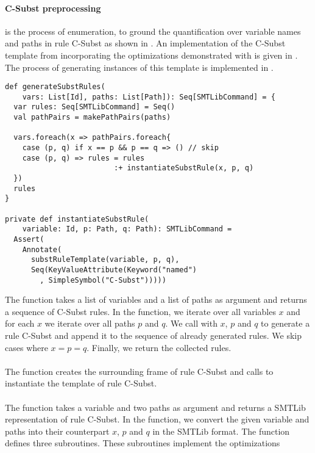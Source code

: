 \paragraph{C-Subst preprocessing} is the process of enumeration,
to ground the quantification over variable names and paths
in rule C-Subst as shown in .
An implementation of the C-Subst template from 
incorporating the optimizations demonstrated with 
is given in .
The process of generating instances of this template
is implemented in .
%
\begin{lstlisting}[caption={Rule Generation for C-Subst},label=lst:subst,captionpos=b,frame={lines}]
def generateSubstRules(
    vars: List[Id], paths: List[Path]): Seq[SMTLibCommand] = {
  var rules: Seq[SMTLibCommand] = Seq()
  val pathPairs = makePathPairs(paths)

  vars.foreach(x => pathPairs.foreach{
    case (p, q) if x == p && p == q => () // skip
    case (p, q) => rules = rules
                         :+ instantiateSubstRule(x, p, q)
  })
  rules
}

private def instantiateSubstRule(
    variable: Id, p: Path, q: Path): SMTLibCommand =
  Assert(
    Annotate(
      substRuleTemplate(variable, p, q),
      Seq(KeyValueAttribute(Keyword("named")
        , SimpleSymbol("C-Subst")))))
\end{lstlisting}
%
The function  takes
a list of variables and a list of paths as argument
and returns a sequence of C-Subst rules.
In the function, we iterate over all variables $x$
and for each $x$ we iterate over all paths $p$ and $q$.
We call  with $x$, $p$ and $q$
to generate a rule C-Subst and append it to the sequence
of already generated rules.
We skip cases where $x = p = q$.
Finally, we return the collected rules.\\
\\
The function 
creates the surrounding frame of rule C-Subst
and calls  to
instantiate the template of rule C-Subst.\\
\\
The function 
takes a variable and two paths as argument
and returns a SMTLib representation
of rule C-Subst.
In the function, we convert the given variable
and paths into their counterpart $x$, $p$ and $q$
in the SMTLib format.
The function defines three subroutines.
These subroutines implement the optimizations
